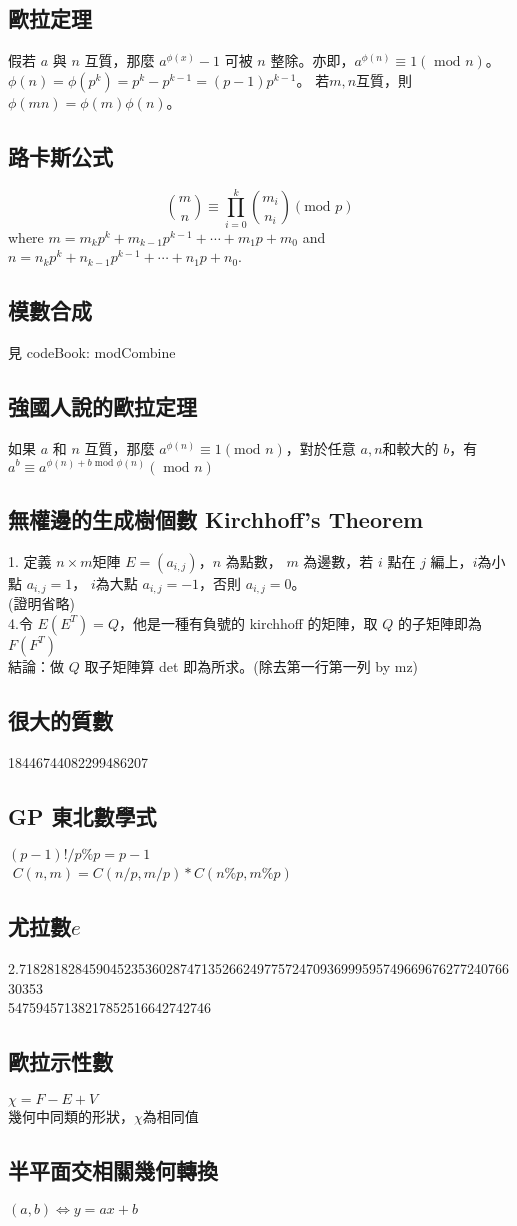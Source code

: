 \subsection{歐拉定理}
假若 $a$ 與 $n$ 互質，那麼 $a^{\phi(x)}-1$ 可被 $n$ 整除。亦即，$a^{\phi(n)}\equiv1(\mbox{ mod }n)$。
$\phi(n)=\phi(p^k)=p^k-p^{k-1}=(p-1)p^{k-1}$。
若$m,n$互質，則$\phi(mn)=\phi(m)\phi(n)$。

\subsection{路卡斯公式}
\[{m\choose n}\equiv\prod_{i=0}^k{m_i \choose n_i}(\mbox{mod }p)\] where $m=m_kp^k+m_{k-1}p^{k-1}+\cdots+m_1p+m_0$ and 
$n=n_kp^k+n_{k-1}p^{k-1}+\cdots+n_1p+n_0$.

\subsection{模數合成}
見 codeBook: modCombine

\subsection{強國人說的歐拉定理}
如果 $a$ 和 $n$ 互質，那麼 $a^{\phi(n)}\equiv1(\mbox{mod }n)$，對於任意 $a,n$和較大的 $b$，有 $a^b\equiv a^{\phi(n)+b\mbox{ mod }\phi(n)}(\mbox{ mod }n)$

\subsection{無權邊的生成樹個數 Kirchhoff's Theorem}
1. 定義 $n\times m$矩陣 $E=(a_{i,j})$，$n$ 為點數， $m$ 為邊數，若 $i$ 點在 $j$ 編上，$i$為小點 $a_{i,j}=1$， $i$為大點 $a_{i,j}=-1$，否則 $a_{i,j}=0$。\\
(證明省略)
\\
4.令 $E(E^T)=Q$，他是一種有負號的 kirchhoff 的矩陣，取 $Q$ 的子矩陣即為 $F(F^T)$\\
結論：做 $Q$ 取子矩陣算 det 即為所求。(除去第一行第一列 by mz)

\subsection{很大的質數}
18446744082299486207

\subsection{GP 東北數學式}
$(p-1)!/p \%p = p-1$\\ $C(n,m) = C(n/p,m/p) * C(n\%p,m\%p)$

\subsection{尤拉數$e$}
2.718281828459045235360287471352662497757247093699959574966967627724076630353\\
54759457138217852516642742746

\subsection{歐拉示性數}
$\chi=F-E+V$\\
幾何中同類的形狀，$\chi$為相同值

\subsection{半平面交相關幾何轉換}
$(a,b)\Leftrightarrow y=ax+b$

